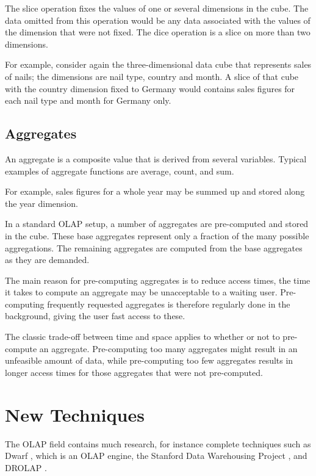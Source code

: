 
The slice operation fixes the values of one or several dimensions in the cube.
The data omitted from this operation would be any data associated with the
values of the dimension that were not fixed. The dice operation is a slice on
more than two dimensions.

For example, consider again the three-dimensional data cube that represents
sales of nails; the dimensions are nail type, country and month. A slice of
that cube with the country dimension fixed to Germany would contains sales
figures for each nail type and month for Germany only.


\subsection*{Aggregates}

An aggregate is a composite value that is derived from several variables.
Typical examples of aggregate functions are average, count, and sum.

For example, sales figures for a whole year may be summed up and stored along
the year dimension.

In a standard OLAP setup, a number of aggregates are pre-computed and
stored in the cube. These base aggregates represent only a fraction of the
many possible aggregations. The remaining aggregates are computed from the
base aggregates as they are demanded.

The main reason for pre-computing aggregates is to reduce access times, the
time it takes to compute an aggregate may be unacceptable to a waiting
user. Pre-computing frequently requested aggregates is therefore regularly
done in the background, giving the user fast access to these.
\cite{olap_solutions}

The classic trade-off between time and space applies to whether or not to
pre-compute an aggregate. Pre-computing too many aggregates might result in an
unfeasible amount of data, while pre-computing too few aggregates results in
longer access times for those aggregates that were not pre-computed.


\section{New Techniques}

The OLAP field contains much research, for instance complete techniques such as
Dwarf \cite{dwarf}, which is an OLAP engine, the Stanford Data Warehousing
Project \cite{thestanford}, and DROLAP \cite{drolap}.

